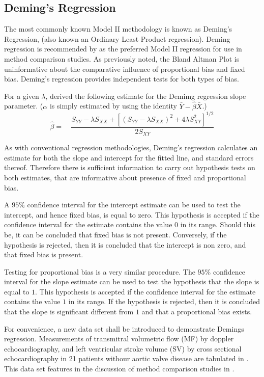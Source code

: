 \documentclass[12pt, a4paper]{report}
\begin{document}
\subsection{Deming's Regression}
The most commonly known Model II methodology is known as Deming's
Regression, (also known an Ordinary Least Product regression).
Deming regression is recommended by \citet*{CornCoch} as the
preferred Model II regression for use in method comparison
studies. As previously noted, the Bland Altman Plot is
uninformative about the comparative influence of proportional bias
and fixed bias. Deming's regression provides independent tests for
both types of bias.

For a given $\lambda$, \citet{Kummel} derived the following
estimate for the Demimg regression slope parameter. ($\alpha$ is
simply estimated by using the identity
$\bar{Y}-\hat{\beta}\bar{X}$.)
\begin{equation}
\hat{\beta} =\quad \frac{S_{YY} - \lambda S_{XX}+[(S_{YY} -
\lambda S_{XX})^{2}+ 4\lambda S^{2}_{XY}]^{1/2}}{2S_{XY}}
\end{equation}


As with conventional regression methodologies, Deming's regression
calculates an estimate for both the slope and intercept for the
fitted line, and standard errors thereof. Therefore there is
sufficient information to carry out hypothesis tests on both
estimates, that are informative about presence of fixed and
proportional bias.

A $95\%$ confidence interval for the intercept estimate can be
used to test the intercept, and hence fixed bias, is equal to
zero. This hypothesis is accepted if the confidence interval for
the estimate contains the value $0$ in its range. Should this be,
it can be concluded that fixed bias is not present. Conversely, if
the hypothesis is rejected, then it is concluded that the
intercept is non zero, and that fixed bias is present.

Testing for proportional bias is a very similar procedure. The
$95\%$ confidence interval for the slope estimate can be used to
test the hypothesis that the slope is equal to $1$. This
hypothesis is accepted if the confidence interval for the estimate
contains the value $1$ in its range. If the hypothesis is
rejected, then it is concluded that the slope is significant
different from $1$ and that a proportional bias exists.

For convenience, a new data set shall be introduced to demonstrate
Demings regression. Measurements of transmitral volumetric flow
(MF) by doppler echocardiography, and left ventricular stroke
volume (SV) by cross sectional echocardiography in 21 patients
withour aortic valve disease are tabulated in \citet{zhang}. This
data set features in the discussion of method comparison studies
in \citet[p.398]{AltmanBook} .
\end{document}
